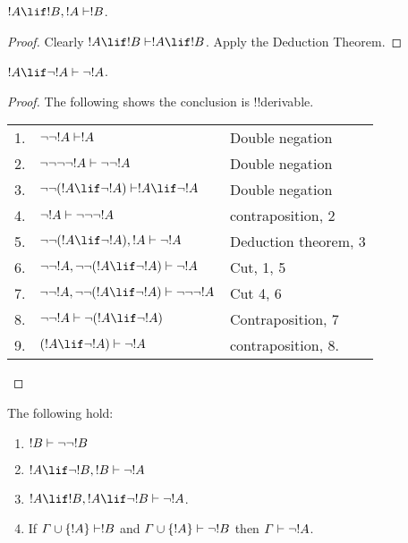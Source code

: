 \documentclass[../../include/open-logic-section]{subfiles}
\begin{document}
\begin{def}
$!A \lif !B, !A \Proves !B$.
\end{def}

\begin{proof}
Clearly $!A \lif !B \Proves !A\lif !B$. Apply the Deduction Theorem.
\end{proof}

\begin{def}
$!A \lif \lnot !A \Proves \lnot !A$.
\end{def}

\begin{proof} The following shows the conclusion is !!{derivable}.
  
  \begin{tabular}{rll}
    1. & $\lnot\lnot!A \Proves !A$ & Double negation \\
    2. & $\lnot\lnot \lnot\lnot!A \Proves \lnot\lnot!A$
    & Double negation \\ 
    3. & $\lnot\lnot(!A \lif \lnot !A) \Proves !A
    \lif \lnot !A$ & Double negation\\
    4. & $\lnot!A \Proves \lnot\lnot\lnot !A$ &
    contraposition, 2\\ 
    5. & $\lnot\lnot(!A \lif \lnot !A), !A
    \Proves \lnot !A$ & Deduction theorem, 3 \\
    6. & $\lnot\lnot!A, \lnot\lnot(!A \lif \lnot
    !A) \Proves  \lnot !A$ & Cut, 1, 5 \\
    7. &  $\lnot\lnot!A, \lnot\lnot(!A \lif \lnot
    !A) \Proves  \lnot\lnot\lnot !A$ & Cut 4, 6 \\
    8. & $\lnot \lnot !A \Proves \lnot (!A \lif \lnot
    !A)$ & Contraposition, 7 \\
    9. & $(!A \lif \lnot !A) \Proves \lnot !A$ &
    contraposition, 8. 
 \end{tabular}

\end{proof}

\begin{prop} 
The following hold:
\begin{enumerate}
\item {} $!B \Proves \lnot \lnot !B$
\item {} $!A \lif \lnot !B, !B \Proves
  \lnot!A$
\item {} $!A\lif !B,!A\lif\lnot !B \Proves
  \lnot!A$.

\item {} If $\Gamma \cup \{ !A \}\Proves !B$
  and $\Gamma \cup \{ !A\} \Proves \lnot !B$ then $\Gamma \Proves
  \lnot!A$.
\end{enumerate}
\end{prop}
\end{document}
